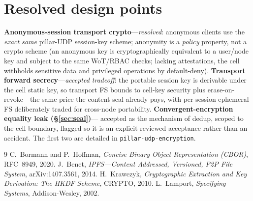 \documentclass[10pt,twocolumn]{article}
\newcommand{\code}[1]{\texttt{\small #1}}
\begin{document}
\section{Resolved design points}
\textbf{Anonymous-session transport crypto}---\emph{resolved}: anonymous clients
use the \emph{exact same} pillar-UDP session-key scheme; anonymity is a
\emph{policy} property, not a crypto scheme (an anonymous key is cryptographically
equivalent to a user/node key and subject to the same WoT/RBAC checks; lacking
attestations, the cell withholds sensitive data and privileged operations by
default-deny). \textbf{Transport forward secrecy}---\emph{accepted tradeoff}: the
portable session key is derivable under the cell static key, so transport FS bounds
to cell-key security plus erase-on-revoke---the same price the content seal already
pays, with per-session ephemeral FS deliberately traded for cross-node
portability. \textbf{Convergent-encryption equality leak (\S\ref{sec:seal})}---
accepted as the mechanism of dedup, scoped to the cell boundary, flagged so it is
an explicit reviewed acceptance rather than an accident. The first two are detailed
in \code{pillar-udp-encryption}.

\begin{thebibliography}{9}
 C.~Bormann and P.~Hoffman, \emph{Concise Binary Object
  Representation (CBOR)}, RFC~8949, 2020.
 J.~Benet, \emph{IPFS---Content Addressed, Versioned, P2P File
  System}, arXiv:1407.3561, 2014.
 H.~Krawczyk, \emph{Cryptographic Extraction and Key Derivation:
  The HKDF Scheme}, CRYPTO, 2010.
 L.~Lamport, \emph{Specifying Systems}, Addison-Wesley, 2002.
\end{thebibliography}
\end{document}
